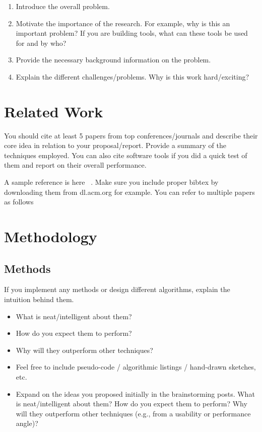 \documentclass{stylefiles/capstone}
\begin{document}
\begin{enumerate}
    \item Introduce the overall problem.
    \item Motivate the importance of the research. For example, why is this an
important problem? If you are building tools, what can these tools be used
for and by who?
    \item Provide the necessary background information on the problem.
    \item Explain the different challenges/problems. Why is this work hard/exciting?
\end{enumerate}

\section{Related Work}

You should cite at least 5 papers from top conferences/journals and describe
their core idea in relation to your proposal/report. Provide a summary of the techniques employed. You can also cite software tools if you did a quick test of them and report on their overall performance.

A sample reference is here ~\cite{chipapers}. Make sure you include proper bibtex by downloading them from dl.acm.org for example. You can refer to multiple papers as follows ~\cite{plpaper,sigraphpaper}

\section{Methodology}

\subsection{Methods}
If you implement any methods or design different algorithms, explain the
intuition behind them.
\begin{itemize}
    \item What is neat/intelligent about them?
    \item How do you expect them to perform?
    \item Why will they outperform other techniques?
    \item Feel free to include pseudo-code / algorithmic listings / hand-drawn sketches, etc.
    \item Expand on the ideas you proposed initially in the brainstorming posts. What
is neat/intelligent about them? How do you expect them to perform? Why
will they outperform other techniques (e.g., from a usability or performance
angle)?
\end{itemize}
\end{document}

